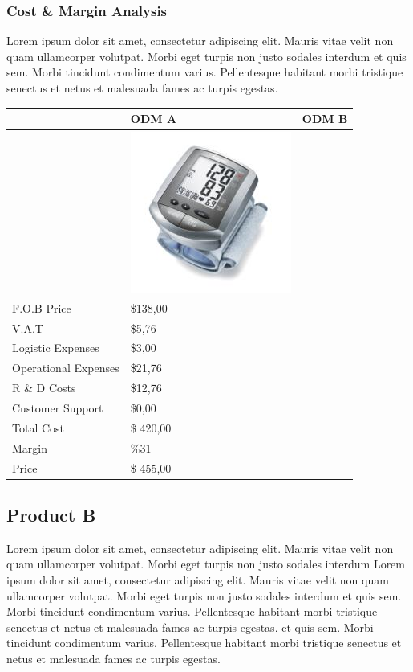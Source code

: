 \documentclass[11pt,titlepage]{article}
\begin{document}
\subsubsection{Cost \& Margin Analysis}
Lorem ipsum dolor sit amet, consectetur adipiscing elit. Mauris vitae velit 
non quam ullamcorper volutpat. Morbi eget turpis non justo sodales interdum 
et quis sem. Morbi tincidunt condimentum varius. Pellentesque habitant morbi 
tristique senectus et netus et malesuada fames ac turpis egestas.\newline
\begin{tabular}{ | l | l | l | }\hline
  & ODM A & ODM B \\\hline
  & \includegraphics[scale=0.40,bb=0 0 150 150]{prod_bpm4.jpg} &\\\hline
  F.O.B Price & \$138,00 &\\\hline
  V.A.T & \$5,76 &\\\hline
  Logistic Expenses & \$3,00 &\\\hline
  Operational Expenses & \$21,76 &\\\hline
  R \& D Costs & \$12,76 &\\\hline
  Customer Support & \$0,00 &\\\hline
  Total Cost & \$ 420,00 &\\\hline
  Margin & \%31 &\\\hline
  Price & \$ 455,00 &\\\hline
\end{tabular}
\pagebreak

\subsection{Product B}
Lorem ipsum dolor sit amet, consectetur adipiscing elit. Mauris vitae velit 
non quam ullamcorper volutpat. Morbi eget turpis non justo sodales interdum 
Lorem ipsum dolor sit amet, consectetur adipiscing elit. Mauris vitae velit 
non quam ullamcorper volutpat. Morbi eget turpis non justo sodales interdum 
et quis sem. Morbi tincidunt condimentum varius. Pellentesque habitant morbi 
tristique senectus et netus et malesuada fames ac turpis egestas.
et quis sem. Morbi tincidunt condimentum varius. Pellentesque habitant morbi 
tristique senectus et netus et malesuada fames ac turpis egestas.\newline
\end{document}
